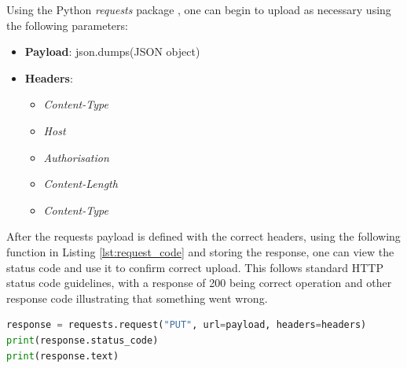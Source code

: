 Using the Python \textit{requests} package \cite{python_requests_lib}, one can begin to upload as necessary using the following parameters:
\begin{itemize}
    \item \textbf{Payload}: json.dumps(JSON object)
    \item \textbf{Headers}:\begin{itemize}
        \item \textit{Content-Type}
        \item \textit{Host}
        \item \textit{Authorisation}
        \item \textit{Content-Length}
        \item \textit{Content-Type}
    \end{itemize}
\end{itemize}
After the requests payload is defined with the correct headers, using the following function in Listing \ref{lst:request_code} and storing the response, one can view the status code and use it to confirm correct upload. This follows standard HTTP status code guidelines, with a response of 200 being correct operation and other response code illustrating that something went wrong.
\begin{lstlisting}[language=Python, caption={Requests Library Usage}, label={lst:request_code}]
response = requests.request("PUT", url=payload, headers=headers)
print(response.status_code)
print(response.text)
\end{lstlisting}




